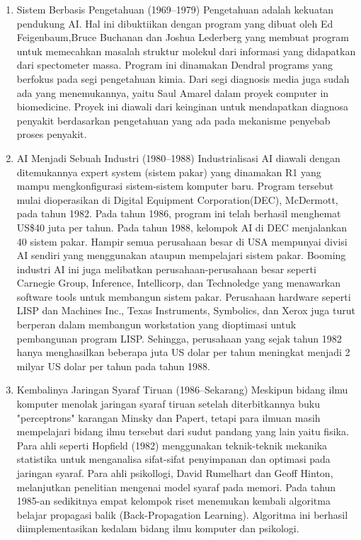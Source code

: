 \begin{enumerate}
	\item Sistem Berbasis Pengetahuan (1969–1979)
	\hfill\break
	Pengetahuan adalah kekuatan pendukung AI. Hal ini dibuktiikan dengan program yang dibuat oleh Ed Feigenbaum,Bruce Buchanan dan Joshua Lederberg yang membuat program untuk memecahkan masalah struktur molekul dari informasi yang didapatkan dari spectometer massa. Program ini dinamakan Dendral programs yang berfokus pada segi pengetahuan kimia. Dari segi diagnosis media juga sudah ada yang menemukannya, yaitu Saul Amarel dalam proyek computer in biomedicine. Proyek ini diawali dari keinginan untuk mendapatkan diagnosa penyakit berdasarkan pengetahuan yang ada pada mekanisme penyebab proses penyakit.

	\item AI Menjadi Sebuah Industri (1980–1988)
	\hfill\break
	Industrialisasi AI diawali dengan ditemukannya expert system (sistem pakar) yang dinamakan R1 yang mampu mengkonfigurasi sistem-sistem komputer baru. Program tersebut mulai dioperasikan di Digital Equipment Corporation(DEC), McDermott, pada tahun 1982. Pada tahun 1986, program ini telah berhasil menghemat US\$40 juta per tahun. Pada tahun 1988, kelompok AI di DEC menjalankan 40 sistem pakar. Hampir semua perusahaan besar di USA mempunyai divisi AI sendiri yang menggunakan ataupun mempelajari sistem pakar. Booming industri AI ini juga melibatkan perusahaan-perusahaan besar seperti Carnegie Group, Inference, Intellicorp, dan Technoledge yang menawarkan software tools untuk membangun sistem pakar. Perusahaan hardware seperti LISP dan Machines Inc., Texas Instruments, Symbolics, dan Xerox juga turut berperan dalam membangun workstation yang dioptimasi untuk pembangunan program LISP. Sehingga, perusahaan yang sejak tahun 1982 hanya menghasilkan beberapa juta US dolar per tahun meningkat menjadi 2 milyar US dolar per tahun pada tahun 1988.

	\item Kembalinya Jaringan Syaraf Tiruan (1986–Sekarang)
	\hfill\break
	Meskipun bidang ilmu komputer menolak jaringan syaraf tiruan setelah diterbitkannya buku "perceptrons" karangan Minsky dan Papert, tetapi para ilmuan masih mempelajari bidang ilmu tersebut dari sudut pandang yang lain yaitu fisika. Para ahli seperti Hopfield (1982) menggunakan teknik-teknik mekanika statistika untuk menganalisa sifat-sifat penyimpanan dan optimasi pada jaringan syaraf. Para ahli psikollogi, David Rumelhart dan Geoff Hinton, melanjutkan penelitian mengenai model syaraf pada memori. Pada tahun 1985-an sedikitnya empat kelompok riset menemukan kembali algoritma belajar propagasi balik (Back-Propagation Learning). Algoritma ini berhasil diimplementasikan kedalam bidang ilmu komputer dan psikologi.

\end{enumerate}

